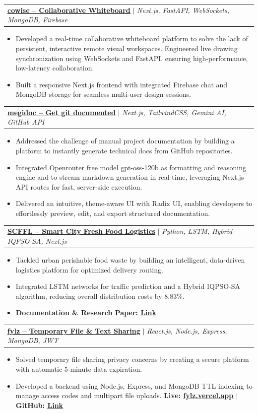 \documentclass[letterpaper,11pt]{article}
\makeatletter
\newcommand{\resumeItem}[1]{
  \item\small{
    {#1 \vspace{-2pt}}
  }
}
\newcommand{\resumeProjectHeading}[2]{
    \item
    \begin{tabular*}{0.97\textwidth}{l@{\extracolsep{\fill}}r}
      \small#1 & #2 \\
    \end{tabular*}\vspace{-7pt}
}
\newcommand{\resumeItemListStart}{\begin{itemize}}
\newcommand{\resumeItemListEnd}{\end{itemize}\vspace{-5pt}}
\makeatother
\begin{document}
\resumeProjectHeading
    {\textbf{\href{https://www.notion.so/Cowsie-An-actual-collaborative-white-board-with-AI-assistance-3625730cdd8780d0b563cd0253dd0f4a?source=copy_link}{\underline{cowise -- Collaborative Whiteboard}}} $|$ \emph{Next.js, FastAPI, WebSockets, MongoDB, Firebase}}{}
    \resumeItemListStart
        \resumeItem{Developed a real-time collaborative whiteboard platform to solve the lack of persistent, interactive remote visual workspaces. Engineered live drawing synchronization using WebSockets and FastAPI, ensuring high-performance, low-latency collaboration.}
        \resumeItem{Built a responsive Next.js frontend with integrated Firebase chat and MongoDB storage for seamless multi-user design sessions.}
    \resumeItemListEnd

\resumeProjectHeading
    {\textbf{\href{https://www.notion.so/Megidoc-Get-git-Documented-3255730cdd87803cb1c6e9b72f534026?source=copy_link}{\underline{megidoc – Get git documented}}} $|$ \emph{Next.js, TailwindCSS, Gemini AI, GitHub API}}{}
    \resumeItemListStart
        \resumeItem{Addressed the challenge of manual project documentation by building a platform to instantly generate technical docs from GitHub repositories.}
        \resumeItem{Integrated Openrouter free model gpt-oss-120b as formatting and reasoning engine and to stream markdown generation in real-time, leveraging Next.js API routes for fast, server-side execution.}
        \resumeItem{Delivered an intuitive, theme-aware UI with Radix UI, enabling developers to effortlessly preview, edit, and export structured documentation.}
    \resumeItemListEnd

\resumeProjectHeading
    {\textbf{\href{https://github.com/MohassinHussain/SCFFL}{\underline{SCFFL – Smart City Fresh Food Logistics}}} $|$ \emph{Python, LSTM, Hybrid IQPSO-SA, Next.js}}{}
    \resumeItemListStart
        \resumeItem{Tackled urban perishable food waste by building an intelligent, data-driven logistics platform for optimized delivery routing. }
        \resumeItem{Integrated LSTM networks for traffic prediction and a Hybrid IQPSO-SA algorithm, reducing overall distribution costs by 8.83\%.}
        \resumeItem{\textbf{Documentation \& Research Paper: \href{https://drive.google.com/file/d/1I0esLbiFlOXEO2mjH7dMJTtryj6h-4dD/view?usp=sharing}{\underline{Link}}}}
    \resumeItemListEnd

\resumeProjectHeading
    {\textbf{\href{https://github.com/MohassinHussain/fylz}{\underline{fylz – Temporary File \& Text Sharing}}} $|$ \emph{React.js, Node.js, Express, MongoDB, JWT}}{}
    \resumeItemListStart
        \resumeItem{Solved temporary file sharing privacy concerns by creating a secure platform with automatic 5-minute data expiration.}
        \resumeItem{Developed a backend using Node.js, Express, and MongoDB TTL indexing to manage access codes and multipart file uploads. \textbf{Live: \href{https://fylz.vercel.app}{\underline{fylz.vercel.app}} $|$ GitHub: \href{https://github.com/MohassinHussain/fylz}{\underline{Link}}}}
    \resumeItemListEnd
\end{document}
